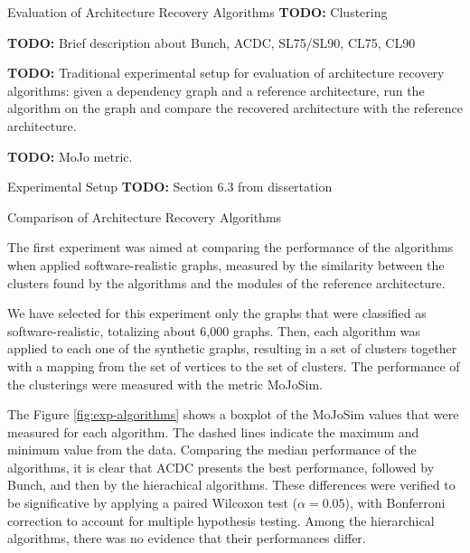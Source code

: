 \documentclass[11pt,twocolumn,a4paper,english]{article}
\newcommand{\TODO}{\textbf{TODO:} }
\begin{document}

\begin{section}{Evaluation of Architecture Recovery Algorithms}
	\TODO Clustering

	\TODO Brief description about Bunch, ACDC, SL75/SL90, CL75, CL90
	
	\TODO Traditional experimental setup for evaluation of architecture recovery algorithms: given a dependency graph and a reference architecture, run the algorithm on the graph and compare the recovered architecture with the reference architecture.
	
	\TODO MoJo metric.

\begin{subsection}{Experimental Setup}
	\TODO Section 6.3 from dissertation
\end{subsection}

\begin{subsection}{Comparison of Architecture Recovery Algorithms}
	
	The first experiment was aimed at comparing the performance of the algorithms when applied software-realistic graphs, measured by the similarity between the clusters found by the algorithms and the modules of the reference architecture.
	
	We have selected for this experiment only the graphs that were classified as software-realistic, totalizing about 6,000 graphs. Then, each algorithm was applied to each one of the synthetic graphs, resulting in a set of clusters together with a mapping from the set of vertices to the set of clusters. The performance of the clusterings were measured with the metric MoJoSim.
	
	The Figure \ref{fig:exp-algorithms} shows a boxplot of the MoJoSim values that were measured for each algorithm. The dashed lines indicate the maximum and minimum value from the data. Comparing the median performance of the algorithms, it is clear that ACDC presents the best performance, followed by Bunch, and then by the hierachical algorithms. These differences were verified to be significative by applying a paired Wilcoxon test ($\alpha = 0.05$), with Bonferroni correction to account for multiple hypothesis testing. Among the hierarchical algorithms, there was no evidence that their performances differ.
	

\end{subsection}
\end{section}
\end{document}
